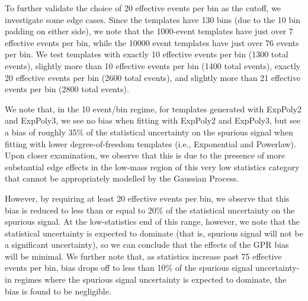 \clearpage

To further validate the choice of 20 effective events per bin as the cutoff, we investigate some edge cases. Since the templates have 130 bins (due to the 10 bin padding on either side), we note that the 1000-event templates have just over 7 effective events per bin, while the 10000 event templates have just over 76 events per bin. We test templates with exactly 10 effective events per bin (1300 total events), slightly more than 10 effective events per bin (1400 total events), exactly 20 effective events per bin (2600 total events), and slightly more than 21 effective events per bin (2800 total events).

We note that, in the 10 event/bin regime, for templates generated with ExpPoly2 and ExpPoly3, we see no bias when fitting with ExpPoly2 and ExpPoly3, but see a bias of roughly 35\% of the statistical uncertainty on the spurious signal when fitting with lower degree-of-freedom templates (i.e., Exponential and Powerlaw). Upon closer examination, we observe that this is due to the presence of more substantial edge effects in the low-mass region of this very low statistics category that cannot be appropriately modelled by the Gaussian Process.

However, by requiring at least 20 effective events per bin, we observe that this bias is reduced to less than or equal to 20\% of the statistical uncertainty on the spurious signal. At the low-statistics end of this range, however, we note that the statistical uncertainty is expected to dominate (that is, spurious signal will not be a significant uncertainty), so we can conclude that the effects of the GPR bias will be minimal. We further note that, as statistics increase past 75 effective events per bin, bias drops off to less than 10\% of the spurious signal uncertainty- in regimes where the spurious signal uncertainty is expected to dominate, the bias is found to be negligible.

